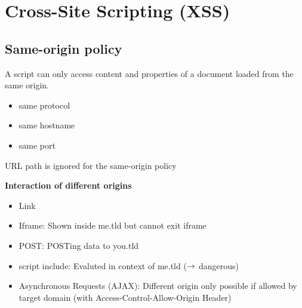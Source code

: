 \documentclass[english, leagacyboxes, nologo]{latex4ei/latex4ei_sheet}
\begin{document}
{  \section{Cross-Site Scripting (XSS)}
  \subsection{Same-origin policy}
  A script can only access content and properties of a document loaded from the same origin.
  \begin{itemize}
  \item same protocol
  \item same hostname
  \item same port
  \end{itemize}
  URL path is ignored for the same-origin policy

  \textbf{Interaction of different origins}
  \begin{itemize}
  \item Link
  \item Iframe: Shown inside me.tld but cannot exit iframe
  \item POST: POSTing data to you.tld
  \item script include: Evaluted in context of me.tld ($\rightarrow$ dangerous)
  \item Asynchronous Requests (AJAX): Different origin only possible if allowed by target domain (with Access-Control-Allow-Origin Header)
  \end{itemize}
  }   \sectionbox{
}
\end{document}
